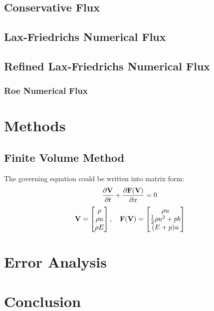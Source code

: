 \documentclass[11pt]{diazessay} %
\begin{document}
\subsection{Conservative Flux}
\subsection{Lax-Friedrichs Numerical Flux}
\subsection{Refined Lax-Friedrichs Numerical Flux}
\subsubsection{Roe Numerical Flux}



\section{Methods}
\subsection{Finite Volume Method}

The governing equation could be written into matrix form:
$$
    \frac{\partial \bf{V}}{\partial t} + \frac{\partial \bf{F}(\bf{V})}{\partial x} =0\\
$$
$$
    \bf{V} = \begin{bmatrix}
        \rho \\ \rho u\\ \rho E
    \end{bmatrix}, \quad \bf{F}(\bf{V})=\begin{bmatrix}
        \rho u \\\frac{1}{2}\rho u^2 + p b\\(E + p) u
    \end{bmatrix}
$$

\section{Error Analysis}
\section{Conclusion}





\end{document}
